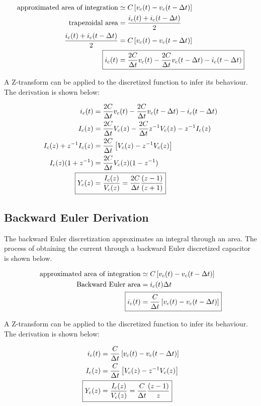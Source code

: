 \documentclass[10pt, oneside, letterpaper]{article}
\begin{document}
\begin{alignat}{2}
  \text{approximated area of integration} &\simeq C\left[v_c(t)-v_c(t-\Delta{}t)\right] \\
  \text{trapezoidal area} &= \frac{i_c(t) + i_c(t-\Delta{}t)}{2} \\
  \frac{i_c(t) + i_c(t-\Delta{}t)}{2} &= C\left[v_c(t)-v_c(t-\Delta{}t)\right] \\
  \Aboxed{i_c(t) &= \frac{2C}{\Delta{}t}v_c(t) - \frac{2C}{\Delta{}t}v_c(t-\Delta{}t) - i_c(t-\Delta{}t)}
\end{alignat}

A Z-transform can be applied to the discretized function to infer its behaviour. The derivation is shown below:

\begin{alignat}{2}
  i_c(t) &= \frac{2C}{\Delta{}t}v_c(t) - \frac{2C}{\Delta{}t}v_c(t-\Delta{}t) - i_c(t-\Delta{}t) \\
  I_c(z) &= \frac{2C}{\Delta{}t}V_c(z) - \frac{2C}{\Delta{}t}z^{-1}V_c(z) - z^{-1}I_c(z) \\
  I_c(z) + z^{-1}I_c(z) &= \frac{2C}{\Delta{}t}\left[V_c(z) - z^{-1}V_c(z)\right] \\
  I_c(z)(1 + z^{-1}) &= \frac{2C}{\Delta{}t}V_c(z)(1 - z^{-1}) \\
  \Aboxed{Y_c(z) &= \frac{I_c(z)}{V_c(z)} = \frac{2C}{\Delta{}t}\frac{(z - 1)}{(z + 1)}}
\end{alignat}

\subsection{Backward Euler Derivation}

The backward Euler discretization approximates an integral through an area. The process of obtaining the current through a backward Euler discretized capacitor is shown below.

\begin{alignat}{2}
  \text{approximated area of integration} &\simeq C\left[v_c(t)-v_c(t-\Delta{}t)\right] \\
  \text{Backward Euler area} &= i_c(t)\Delta{}t \\
  \Aboxed{i_c(t) &= \frac{C}{\Delta{}t}\left[v_c(t)-v_c(t-\Delta{}t)\right]}
\end{alignat}

A Z-transform can be applied to the discretized function to infer its behaviour. The derivation is shown below:

\begin{alignat}{2}
  i_c(t) &= \frac{C}{\Delta{}t}\left[v_c(t)-v_c(t-\Delta{}t)\right] \\
  I_c(z) &= \frac{C}{\Delta{}t}\left[V_c(z)-z^{-1}V_c(z)\right] \\
  \Aboxed{Y_c(z) &= \frac{I_c(z)}{V_c(z)} = \frac{C}{\Delta{}t}\frac{(z - 1)}{z}}
\end{alignat}
\end{document}
